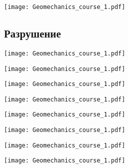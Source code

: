 \documentclass[main.tex]{subfiles}
\begin{document}
\begin{center}
\texttt{[image: Geomechanics\_course\_1.pdf]}
\end{center}

\subsection{Разрушение}

\begin{center}
\texttt{[image: Geomechanics\_course\_1.pdf]}
\end{center}

\begin{center}
\texttt{[image: Geomechanics\_course\_1.pdf]}
\end{center}

\begin{center}
\texttt{[image: Geomechanics\_course\_1.pdf]}
\end{center}

\begin{center}
\texttt{[image: Geomechanics\_course\_1.pdf]}
\end{center}

\begin{center}
\texttt{[image: Geomechanics\_course\_1.pdf]}
\end{center}

\begin{center}
\texttt{[image: Geomechanics\_course\_1.pdf]}
\end{center}

\begin{center}
\texttt{[image: Geomechanics\_course\_1.pdf]}
\end{center}

\begin{center}
\texttt{[image: Geomechanics\_course\_1.pdf]}
\end{center}
\end{document}
